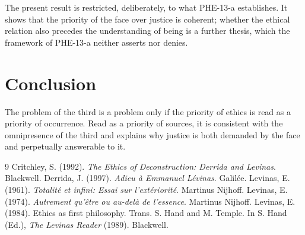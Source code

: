 \documentclass{situationist-preprint}
\begin{document}
\begin{reply}
The present result is restricted, deliberately, to what PHE-13-a establishes. It shows that the priority of the face over justice is coherent; whether the ethical relation also precedes the understanding of being is a further thesis, which the framework of PHE-13-a neither asserts nor denies.
\end{reply}

\section{Conclusion}

The problem of the third is a problem only if the priority of ethics is read as a priority of occurrence. Read as a priority of sources, it is consistent with the omnipresence of the third and explains why justice is both demanded by the face and perpetually answerable to it.

\begin{thebibliography}{9}\small
{} Critchley, S. (1992). \emph{The Ethics of Deconstruction: Derrida and Levinas}. Blackwell.
 Derrida, J. (1997). \emph{Adieu \`a Emmanuel L\'evinas}. Galil\'ee.
 Levinas, E. (1961). \emph{Totalit\'e et infini: Essai sur l'ext\'eriorit\'e}. Martinus Nijhoff.
 Levinas, E. (1974). \emph{Autrement qu'\^etre ou au-del\`a de l'essence}. Martinus Nijhoff.
 Levinas, E. (1984). Ethics as first philosophy. Trans. S. Hand and M. Temple. In S. Hand (Ed.), \emph{The Levinas Reader} (1989). Blackwell.
\end{thebibliography}
\end{document}
